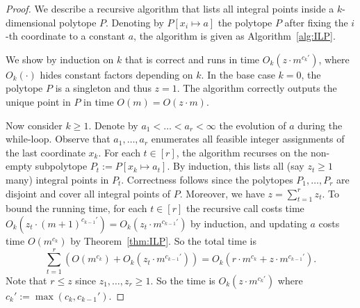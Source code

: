 \documentclass[a4paper, 11pt]{article}
\begin{document}
\begin{proof}
	We describe a recursive algorithm  that lists all integral points inside a $k$-dimensional polytope $P$. Denoting by $P[x_i \mapsto a]$ the polytope $P$ after fixing the $i$-th coordinate to a constant $a$, the algorithm is given as Algorithm~\ref{alg:ILP}.
    
	\begin{algorithm}[htbp]
        \caption{Listing all solutions in an ILP}
        \label{alg:ILP}
    \end{algorithm}

    We show by induction on $k$ that  is correct and runs in time $O_k(z \cdot m^{c_k'})$, where $O_k(\cdot)$ hides constant factors depending on $k$. In the base case $k = 0$, the polytope $P$ is a singleton and thus $z = 1$. The algorithm correctly outputs the unique point in $P$ in time $O(m) = O(z \cdot m)$.

    Now consider $k \geq 1$. Denote by $a_1 < \dots < a_r < \infty$ the evolution of $a$ during the while-loop. Observe that $a_1, \dots, a_r$ enumerates all feasible integer assignments of the last coordinate $x_k$. For each $t \in [r]$, the algorithm recurses on the non-empty subpolytope $P_t := P[x_k \mapsto a_t]$. By induction, this lists all (say $z_t \geq 1$ many) integral points in $P_t$. Correctness follows since the polytopes $P_1, \dots, P_r$ are disjoint and cover all integral points of $P$. Moreover, we have $z = \sum_{t=1}^r z_t$. To bound the running time, for each $t \in [r]$ the recursive call costs time $O_k(z_t \cdot (m+1)^{c_{k-1}'}) = O_k(z_t \cdot m^{c_{k-1}'})$ by induction, and updating $a$ costs time $O(m^{c_k})$ by Theorem~\ref{thm:ILP}. So the total time is
	\[ \sum_{t=1}^r \left( O(m^{c_k}) + O_k(z_t \cdot m^{c_{k-1}'}) \right) = O_k(r \cdot m^{c_k} + z \cdot m^{c_{k-1}'}). \]
	Note that $r \leq z$ since $z_1, \dots, z_r \geq 1$. So the time is $O_k(z \cdot m^{c_k'})$ where $c_k' := \max(c_k, c_{k-1}')$.
\end{proof}
\end{document}
